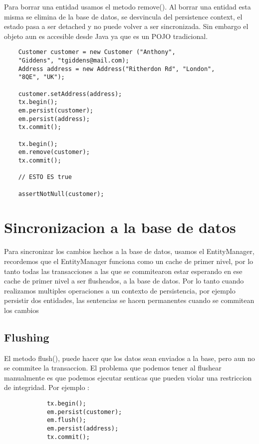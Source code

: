 \documentclass{article}
\begin{document}
Para borrar una entidad usamos el metodo remove(). Al borrar una entidad esta misma se elimina de la base de datos, se desvincula del persistence context,
el estado pasa a ser detached y no puede volver a ser sincronizada. Sin embargo el objeto aun es accesible desde Java ya que es un POJO tradicional.

\begin{lstlisting}
    Customer customer = new Customer ("Anthony", 
    "Giddens", "tgiddens@mail.com);
    Address address = new Address("Ritherdon Rd", "London",
    "8QE", "UK");	

    customer.setAddress(address);
    tx.begin();
    em.persist(customer);
    em.persist(address);
    tx.commit();

    tx.begin();
    em.remove(customer);
    tx.commit();

    // ESTO ES true

    assertNotNull(customer);

\end{lstlisting}

\section*{Sincronizacion a la base de datos}

Para sincronizar los cambios hechos a la base de datos, usamos el EntityManager, recordemos que el EntityManager funciona como un cache de primer nivel, por lo tanto todas las transacciones a las que se commitearon
estar esperando en ese cache de primer nivel a ser flusheados, a la base de datos. Por lo tanto cuando realizamos multiples operaciones a un contexto de persistencia, por ejemplo persistir dos entidades, las sentencias se
hacen permanentes cuando se commitean los cambios

\subsection*{Flushing}

El metodo flush(), puede hacer que los datos sean enviados a la base, pero aun no se commitee la transaccion. El problema que podemos tener al flushear manualmente es que podemos ejecutar senticas que pueden violar una restriccion de
integridad. Por ejemplo :
\begin{lstlisting}
            tx.begin();
            em.persist(customer);
            em.flush();
            em.persist(address);
            tx.commit();
        \end{lstlisting}
\end{document}
